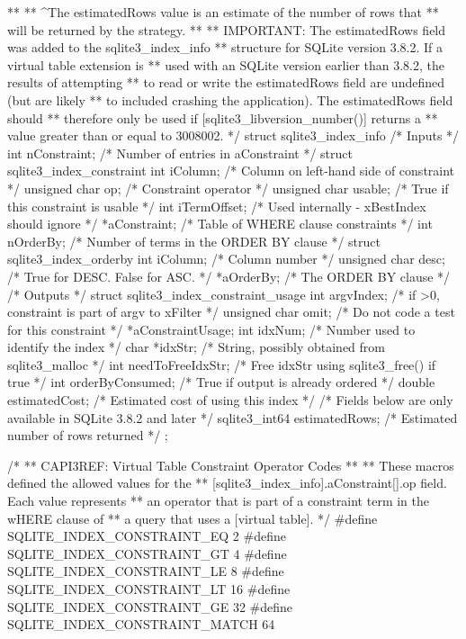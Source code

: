 \begin{Codex}[label=sqlite3.h,numbers=left]
{**
** ^The estimatedRows value is an estimate of the number of rows that
** will be returned by the strategy.
**
** IMPORTANT: The estimatedRows field was added to the sqlite3_index_info
** structure for SQLite version 3.8.2. If a virtual table extension is
** used with an SQLite version earlier than 3.8.2, the results of attempting 
** to read or write the estimatedRows field are undefined (but are likely 
** to included crashing the application). The estimatedRows field should
** therefore only be used if [sqlite3_libversion_number()] returns a
** value greater than or equal to 3008002.
*/
struct sqlite3_index_info {
  /* Inputs */
  int nConstraint;           /* Number of entries in aConstraint */
  struct sqlite3_index_constraint {
     int iColumn;              /* Column on left-hand side of constraint */
     unsigned char op;         /* Constraint operator */
     unsigned char usable;     /* True if this constraint is usable */
     int iTermOffset;          /* Used internally - xBestIndex should ignore */
  } *aConstraint;            /* Table of WHERE clause constraints */
  int nOrderBy;              /* Number of terms in the ORDER BY clause */
  struct sqlite3_index_orderby {
     int iColumn;              /* Column number */
     unsigned char desc;       /* True for DESC.  False for ASC. */
  } *aOrderBy;               /* The ORDER BY clause */
  /* Outputs */
  struct sqlite3_index_constraint_usage {
    int argvIndex;           /* if >0, constraint is part of argv to xFilter */
    unsigned char omit;      /* Do not code a test for this constraint */
  } *aConstraintUsage;
  int idxNum;                /* Number used to identify the index */
  char *idxStr;              /* String, possibly obtained from sqlite3_malloc */
  int needToFreeIdxStr;      /* Free idxStr using sqlite3_free() if true */
  int orderByConsumed;       /* True if output is already ordered */
  double estimatedCost;           /* Estimated cost of using this index */
  /* Fields below are only available in SQLite 3.8.2 and later */
  sqlite3_int64 estimatedRows;    /* Estimated number of rows returned */
};

/*
** CAPI3REF: Virtual Table Constraint Operator Codes
**
** These macros defined the allowed values for the
** [sqlite3_index_info].aConstraint[].op field.  Each value represents
** an operator that is part of a constraint term in the wHERE clause of
** a query that uses a [virtual table].
*/
#define SQLITE_INDEX_CONSTRAINT_EQ    2
#define SQLITE_INDEX_CONSTRAINT_GT    4
#define SQLITE_INDEX_CONSTRAINT_LE    8
#define SQLITE_INDEX_CONSTRAINT_LT    16
#define SQLITE_INDEX_CONSTRAINT_GE    32
#define SQLITE_INDEX_CONSTRAINT_MATCH 64

}
\end{Codex}
